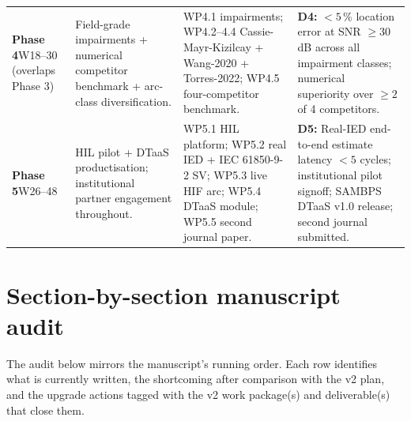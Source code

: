 \documentclass[11pt,a4paper]{article}
\begin{document}
\begin{longtable}{L{1.4cm}L{4.0cm}L{5.6cm}L{4.0cm}}
\textbf{Phase 4}\newline W18--30 (overlaps Phase 3) &
Field-grade impairments + numerical competitor benchmark + arc-class
diversification. &
WP4.1 impairments; WP4.2--4.4 Cassie-Mayr-Kizilcay + Wang-2020 +
Torres-2022; WP4.5 four-competitor benchmark. &
\textbf{D4:} $<5$\,\% location error at SNR $\geq 30$\,dB across all
impairment classes; numerical superiority over $\geq 2$ of 4
competitors.\\

\textbf{Phase 5}\newline W26--48 &
HIL pilot + DTaaS productisation; institutional partner engagement
throughout. &
WP5.1 HIL platform; WP5.2 real IED + IEC 61850-9-2 SV;
WP5.3 live HIF arc; WP5.4 DTaaS module; WP5.5 second journal paper. &
\textbf{D5:} Real-IED end-to-end estimate latency $<5$ cycles;
institutional pilot signoff; SAMBPS DTaaS v1.0 release; second journal
submitted.\\

\bottomrule
\end{longtable}

\section{Section-by-section manuscript audit}

The audit below mirrors the manuscript's running order.  Each row
identifies what is currently written, the shortcoming after comparison
with the v2 plan, and the upgrade actions tagged with the v2 work
package(s) and deliverable(s) that close them.
\end{document}
